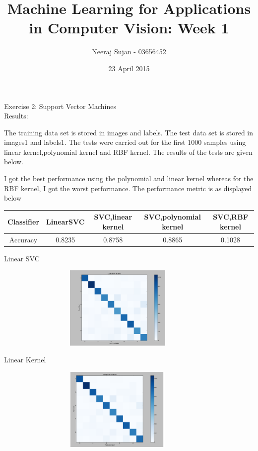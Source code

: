 \documentclass[12pt]{article}
\title{Machine Learning for Applications in Computer Vision: Week 1}
\author{Neeraj Sujan - 03656452 }
\date{23 April 2015}
\begin{document}
\maketitle

Exercise 2: Support Vector Machines
\\

Results:

The training data set is stored in images and labels. The test data set is stored in images1 and labels1. The tests were carried out for the first 1000 samples using linear kernel,polynomial kernel and RBF kernel. The results of the tests are given below. 

I got the best performance using the polynomial and linear kernel whereas for the RBF kernel, I got the worst performance. The performance metric is as displayed below \\

\begin{table}[h]
\centering
\begin{tabular}{|c|c|c|c|c|}
\hline 
Classifier & LinearSVC & SVC,linear kernel & SVC,polynomial kernel & SVC,RBF kernel \\ 
\hline 
Accuracy & 0.8235 & 0.8758 & 0.8865 & 0.1028 \\ 
\hline 
\end{tabular} 
\end{table}

Linear SVC
\begin{figure}[h]
\centering
\includegraphics[width=10cm, height=4cm]{1}
\end{figure}


Linear Kernel
\begin{figure}[h]
\centering
\includegraphics[width=10cm, height=4cm]{2}
\end{figure}
\end{document}

